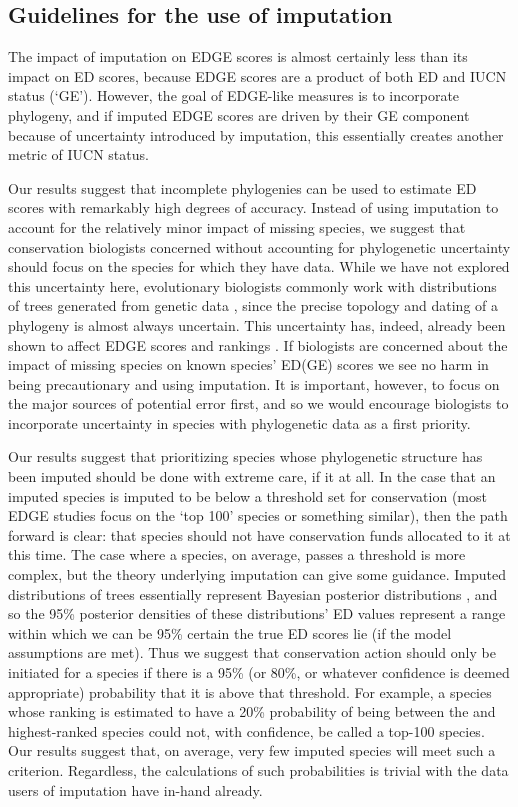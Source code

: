 \documentclass[10pt,english]{article}
\begin{document}
\subsection*{Guidelines for the use of imputation}
The impact of imputation on EDGE scores is almost certainly less than its impact
on ED scores, because EDGE scores are a product of both ED and IUCN status
(‘GE'). However, the goal of EDGE-like measures is to incorporate phylogeny, and
if imputed EDGE scores are driven by their GE component because of uncertainty
introduced by imputation, this essentially creates another metric of IUCN
status.

Our results suggest that incomplete phylogenies can be used to estimate ED
scores with remarkably high degrees of accuracy. Instead of using imputation to
account for the relatively minor impact of missing species, we suggest that
conservation biologists concerned without accounting for phylogenetic uncertainty
should focus on the species for which they have data. While we have not explored this
uncertainty here, evolutionary biologists commonly work with distributions of
trees generated from genetic data \autocite[reviewed in][]{Huelsenbeck2001,
Bollback2005}, since the precise topology and dating of a phylogeny is almost
always uncertain. This uncertainty has, indeed, already been shown to affect
EDGE scores and rankings \autocite{Pearse2015}.
If biologists are concerned about the impact of missing species on known species'
ED(GE) scores we see no harm in being precautionary and using imputation. It is
important, however, to focus on the major sources of potential error first,
and so we would encourage biologists to incorporate uncertainty in species
with phylogenetic data as a first priority.

Our results suggest that prioritizing species whose phylogenetic structure has
been imputed should be done with extreme care, if it at all. In the case that an
imputed species is imputed to be below a threshold set for conservation (most
EDGE studies focus on the ‘top 100' species or something similar), then the path
forward is clear: that species should not have conservation funds allocated to
it at this time. The case where a species, on average, passes a threshold is
more complex, but the theory underlying imputation can give some guidance.
Imputed distributions of trees essentially represent Bayesian posterior
distributions \autocite{Kuhn2011}, and so the 95\% posterior densities of these
distributions' ED values represent a range within which we can be 95\% certain
the true ED scores lie (if the model assumptions are met). Thus we suggest that
conservation action should only be initiated for a species if there is a 95\%
(or 80\%, or whatever confidence is deemed appropriate) probability that it is
above that threshold. For example, a species whose ranking is estimated to have a 20\%
probability of being between the  and  highest-ranked species
could not, with confidence, be called a top-100 species. Our results suggest
that, on average, very few imputed species will meet such a criterion.
Regardless, the calculations of such probabilities is trivial with the data
users of imputation have in-hand already.
\end{document}
